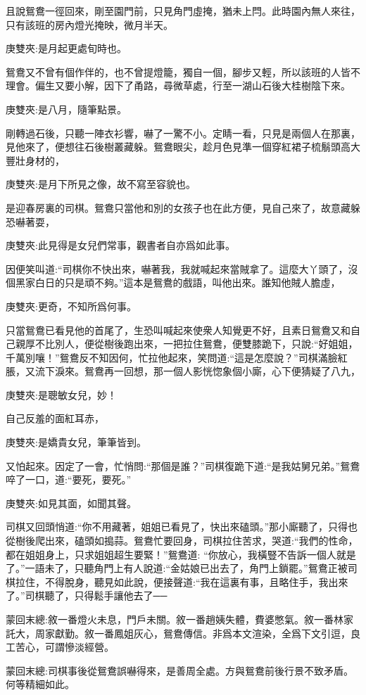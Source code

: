 \begin{parag}
    且說鴛鴦一徑回來，剛至園門前，只見角門虛掩，猶未上閂。此時園內無人來往，只有該班的房內燈光掩映，微月半天。\begin{note}庚雙夾:是月起更處旬時也。\end{note}鴛鴦又不曾有個作伴的，也不曾提燈籠，獨自一個，腳步又輕，所以該班的人皆不理會。偏生又要小解，因下了甬路，尋微草處，行至一湖山石後大桂樹陰下來。\begin{note}庚雙夾:是八月，隨筆點景。\end{note}剛轉過石後，只聽一陣衣衫響，嚇了一驚不小。定睛一看，只見是兩個人在那裏，見他來了，便想往石後樹叢藏躲。鴛鴦眼尖，趁月色見準一個穿紅裙子梳鬅頭高大豐壯身材的，\begin{note}庚雙夾:是月下所見之像，故不寫至容貌也。\end{note}是迎春房裏的司棋。鴛鴦只當他和別的女孩子也在此方便，見自己來了，故意藏躲恐嚇著耍，\begin{note}庚雙夾:此見得是女兒們常事，觀書者自亦爲如此事。\end{note}因便笑叫道:“司棋你不快出來，嚇著我，我就喊起來當賊拿了。這麼大丫頭了，沒個黑家白日的只是頑不夠。”這本是鴛鴦的戲語，叫他出來。誰知他賊人膽虛，\begin{note}庚雙夾:更奇，不知所爲何事。\end{note}只當鴛鴦已看見他的首尾了，生恐叫喊起來使衆人知覺更不好，且素日鴛鴦又和自己親厚不比別人，便從樹後跑出來，一把拉住鴛鴦，便雙膝跪下，只說:“好姐姐，千萬別嚷！”鴛鴦反不知因何，忙拉他起來，笑問道:“這是怎麼說？”司棋滿臉紅脹，又流下淚來。鴛鴦再一回想，那一個人影恍惚象個小廝，心下便猜疑了八九，\begin{note}庚雙夾:是聰敏女兒，妙！\end{note}自己反羞的面紅耳赤，\begin{note}庚雙夾:是嬌貴女兒，筆筆皆到。\end{note}又怕起來。因定了一會，忙悄問:“那個是誰？”司棋復跪下道:“是我姑舅兄弟。”鴛鴦啐了一口，道:“要死，要死。”\begin{note}庚雙夾:如見其面，如聞其聲。\end{note}司棋又回頭悄道:“你不用藏著，姐姐已看見了，快出來磕頭。”那小廝聽了，只得也從樹後爬出來，磕頭如搗蒜。鴛鴦忙要回身，司棋拉住苦求，哭道:“我們的性命，都在姐姐身上，只求姐姐超生要緊！”鴛鴦道: “你放心，我橫豎不告訴一個人就是了。”一語未了，只聽角門上有人說道:“金姑娘已出去了，角門上鎖罷。”鴛鴦正被司棋拉住，不得脫身，聽見如此說，便接聲道:“我在這裏有事，且略住手，我出來了。”司棋聽了，只得鬆手讓他去了──
\end{parag}


\begin{parag}
    \begin{note}蒙回末總:敘一番燈火未息，門戶未關。敘一番趙姨失體，費婆憋氣。敘一番林家託大，周家獻勤。敘一番鳳姐灰心，鴛鴦傳信。非爲本文渲染，全爲下文引逗，良工苦心，可謂慘淡經營。\end{note}
\end{parag}


\begin{parag}
    \begin{note}蒙回末總:司棋事後從鴛鴦誤嚇得來，是善周全處。方與鴛鴦前後行景不致矛盾。何等精細如此。\end{note}
\end{parag}
